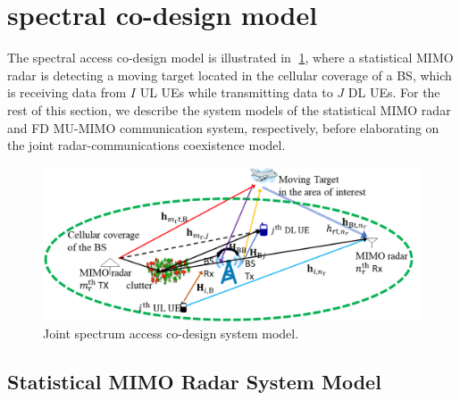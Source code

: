 \documentclass[9pt,journal]{IEEEtran}
\begin{document}
\section{spectral co-design model}
\label{sec:system}
The spectral access co-design model is illustrated in \figurename{$\;$\ref{fig:setup}}, where a statistical MIMO radar is detecting a moving target located in the cellular coverage of a BS, which is receiving data from $\mathit{I}$ UL UEs while transmitting data to $\mathit{J}$ DL UEs. For the rest of this section, we describe the system models of the statistical MIMO radar and FD MU-MIMO communication system, respectively, before elaborating on the joint radar-communications coexistence model.
 \begin{figure}[t]
	\label{fig:setup}
	\centering
	\includegraphics[width=1\columnwidth]{setup_model_tsp.png}
	\caption{Joint spectrum access co-design system model.}
	\vspace{-1em}
\end{figure}
\subsection{Statistical MIMO Radar System Model}
\end{document}
